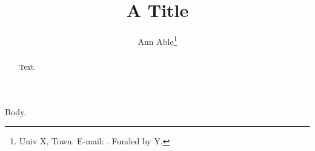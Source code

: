 \documentclass{llncs}
\begin{document}
\title{A Title}
\author{Ann Able\thanks{Univ X, Town. E-mail:
\href{mailto:ann.able@x.edu}{}. Funded by Y.}}
\maketitle
\begin{abstract}Text.\end{abstract}
Body.
\end{document}

